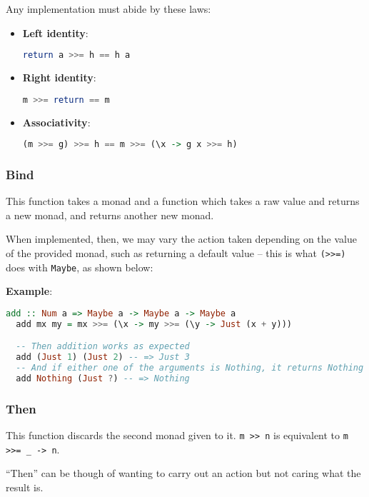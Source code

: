 Any implementation must abide by these laws:
\begin{itemize}
  \item \textbf{Left identity}: \begin{lstlisting}[language=haskell]
return a >>= h == h a\end{lstlisting}
  \item \textbf{Right identity}: \begin{lstlisting}[language=haskell]
m >>= return == m\end{lstlisting}
  \item \textbf{Associativity}: \begin{lstlisting}[language=haskell]
(m >>= g) >>= h == m >>= (\x -> g x >>= h)\end{lstlisting}
\end{itemize}

\subsubsection{Bind}
This function takes a monad and a function which takes a raw value and returns a new monad, and returns another new monad.

When implemented, then, we may vary the action taken depending on the value of the provided monad, such as returning a default value -- this is what \texttt{(>>=)} does with \texttt{Maybe}, as shown below: 

\textbf{Example}:
\begin{lstlisting}[language=haskell]
  add :: Num a => Maybe a -> Maybe a -> Maybe a
  add mx my = mx >>= (\x -> my >>= (\y -> Just (x + y)))

  -- Then addition works as expected
  add (Just 1) (Just 2) -- => Just 3
  -- And if either one of the arguments is Nothing, it returns Nothing
  add Nothing (Just ?) -- => Nothing
\end{lstlisting}

\subsubsection{Then}

This function discards the second monad given to it. \texttt{m >> n} is equivalent to \texttt{m >>= \_ -> n}.

``Then'' can be though of wanting to carry out an action but not caring what the result is.

